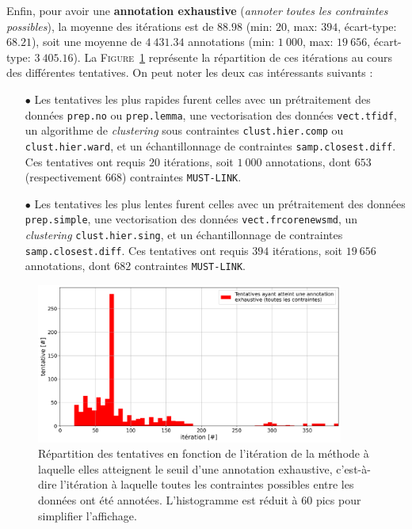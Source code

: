 			Enfin, pour avoir une \textbf{annotation exhaustive} (\textit{annoter toutes les contraintes possibles}), la moyenne des itérations est de $88.98$ (min: $20$, max: $394$, écart-type: $68.21$), soit une moyenne de $4~431.34$ annotations (min: $1~000$, max: $19~656$, écart-type: $3~405.16$).
			La \textsc{Figure~\ref{figure:4.2.1-ETUDE-OPTIMISATION-HISTOGRAMME-ANNOTATION-EXHAUSTIVE}} représente la répartition de ces itérations au cours des différentes tentatives.
			On peut noter les deux cas intéressants suivants :
			\begin{itemize}
				\item[$\bullet$] Les tentatives les plus rapides furent celles avec un prétraitement des données \texttt{prep.no} ou \texttt{prep.lemma}, une vectorisation des données \texttt{vect.tfidf}, un algorithme de \textit{clustering} sous contraintes \texttt{clust.hier.comp} ou \texttt{clust.hier.ward}, et un échantillonnage de contraintes \texttt{samp.closest.diff}. Ces tentatives ont requis $20$ itérations, soit $1~000$ annotations, dont $653$ (respectivement $668$) contraintes \texttt{MUST-LINK}.
				\item[$\bullet$] Les tentatives les plus lentes furent celles avec un prétraitement des données \texttt{prep.simple}, une vectorisation des données \texttt{vect.frcorenewsmd}, un \textit{clustering} \texttt{clust.hier.sing}, et un échantillonnage de contraintes \texttt{samp.closest.diff}. Ces tentatives ont requis $394$ itérations, soit $19~656$ annotations, dont $682$ contraintes \texttt{MUST-LINK}.
			\end{itemize}
			\begin{figure}[!htb]
				\centering
				\includegraphics[width=0.90\textwidth]{figures/etude-efficience-histogramme-annotation-exhaustive}
				\caption{
					Répartition des tentatives en fonction de l'itération de la méthode à laquelle elles atteignent le seuil d'une annotation exhaustive, c'est-à-dire l'itération à laquelle toutes les contraintes possibles entre les données ont été annotées.
					L'histogramme est réduit à $60$ pics pour simplifier l'affichage.
				}
				\label{figure:4.2.1-ETUDE-OPTIMISATION-HISTOGRAMME-ANNOTATION-EXHAUSTIVE}
			\end{figure}
